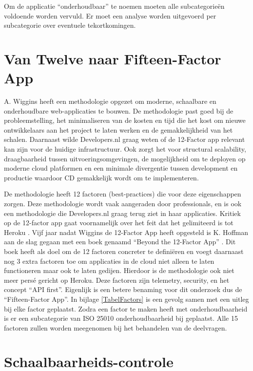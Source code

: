 Om de applicatie \enquote{onderhoudbaar} te noemen moeten alle subcategorieën voldoende worden vervuld. Er moet een analyse worden uitgevoerd per subcategorie over eventuele tekortkomingen.


\section{Van Twelve naar Fifteen-Factor App}

A. Wiggins \parencite{12Factor} heeft een methodologie opgezet om moderne, schaalbare en onderhoudbare web-applicaties te bouwen. De methodologie past goed bij de probleemstelling, het minimaliseren van de kosten en tijd die het kost om nieuwe ontwikkelaars aan het project te laten werken en de gemakkelijkheid van het schalen. Daarnaast wilde Developers.nl graag weten of de 12-Factor app relevant kan zijn voor de huidige infrastructuur. Ook zorgt het voor structural scalability, draagbaarheid tussen uitvoeringsomgevingen, de mogelijkheid om te deployen op moderne cloud platformen en een minimale divergentie tussen development en productie waardoor CD gemakkelijk wordt om te implementeren.

De methodologie heeft 12 factoren (best-practices) die voor deze eigenschappen zorgen. Deze methodologie wordt vaak aangeraden door professionals, en is ook een methodologie die Developers.nl graag terug ziet in haar applicaties. Kritiek op de 12-factor app gaat voornamelijk over het feit dat het gelimiteerd is tot Heroku \parencite{AdaptingTwelveFactor}. Vijf jaar nadat Wiggins de 12-Factor App heeft opgesteld is K. Hoffman aan de slag gegaan met een boek genaamd \enquote{Beyond the 12-Factor App} \parencite{Beyond12Factor}. Dit boek heeft als doel om de 12 factoren concreter te definiëren en voegt daarnaast nog 3 extra factoren toe om applicaties in de cloud niet alleen te laten functioneren maar ook te laten gedijen. Hierdoor is de methodologie ook niet meer persé gericht op Heroku. Deze factoren zijn telemetry, security, en het concept \enquote{API first}. Eigenlijk is een betere benaming voor dit onderzoek dus de \enquote{Fifteen-Factor App}. In bijlage \ref{TabelFactors} is een gevolg samen met een uitleg bij elke factor geplaatst. Zodra een factor te maken heeft met onderhoudbaarheid is er een subcategorie van ISO 25010 onderhoudbaarheid bij geplaatst. Alle 15 factoren zullen worden meegenomen bij het behandelen van de deelvragen.

\section{Schaalbaarheids-controle}

